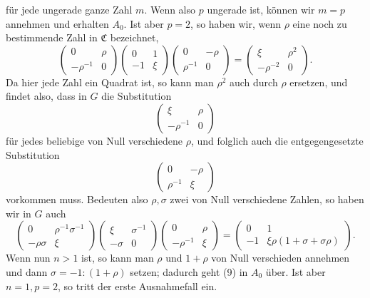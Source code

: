 \documentclass[11pt]{article}
\begin{document}
für jede ungerade ganze Zahl $m$. Wenn also $p$ ungerade ist, können wir $m=p$ annehmen und erhalten $A_0$. Ist aber $p=2$, so haben wir, wenn $\rho$ eine noch zu bestimmende Zahl in $\mathfrak C$ bezeichnet,
\[
 \begin{pmatrix}0&\rho\\-\rho^{-1}&0\end{pmatrix}
 \begin{pmatrix}0&1\\-1&\xi\end{pmatrix}
 \begin{pmatrix}0&-\rho\\\rho^{-1}&0\end{pmatrix}
 =
 \begin{pmatrix}\xi&\rho^2\\-\rho^{-2}&0\end{pmatrix}.
\]
Da hier jede Zahl ein Quadrat ist, so kann man $\rho^2$ auch durch $\rho$ ersetzen, und findet also, dass in $G$ die Substitution
\[
 \begin{pmatrix}\xi&\rho\\-\rho^{-1}&0\end{pmatrix}
\]
für jedes beliebige von Null verschiedene $\rho$, und folglich auch die entgegengesetzte Substitution
\[
 \begin{pmatrix}0&-\rho\\\rho^{-1}&\xi\end{pmatrix}
\]
vorkommen muss. Bedeuten also $\rho,\sigma$ zwei von Null verschiedene Zahlen, so haben wir in $G$ auch
\begin{equation}
 \begin{pmatrix}0&\rho^{-1}\sigma^{-1}\\-\rho\sigma&\xi\end{pmatrix}
 \begin{pmatrix}\xi&\sigma^{-1}\\-\sigma&0\end{pmatrix}
 \begin{pmatrix}0&\rho\\-\rho^{-1}&\xi\end{pmatrix}
 =
 \begin{pmatrix}0&1\\-1&\xi\rho(1+\sigma+\sigma\rho)\end{pmatrix}.
 \tag{9}
\end{equation}
Wenn nun $n>1$ ist, so kann man $\rho$ und $1+\rho$ von Null verschieden annehmen und dann $\sigma=-1:(1+\rho)$ setzen; dadurch geht (9) in $A_0$ über. Ist aber $n=1,p=2$, so tritt der erste Ausnahmefall ein.
\end{document}
